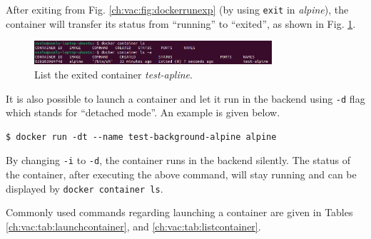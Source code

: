 After exiting from Fig. \ref{ch:vac:fig:dockerrunexp} (by using \verb|exit| in \textit{alpine}), the container will transfer its status from ``running'' to ``exited'', as shown in Fig. \ref{ch:vac:fig:dockerrunexppart3}.
\begin{figure}
	\centering
	\includegraphics[width=250pt]{chapters/ch-virtualization-and-containerization/figures/dockerrunexppart3.png}
	\caption{List the exited container \textit{test-apline}.} \label{ch:vac:fig:dockerrunexppart3}
\end{figure}

It is also possible to launch a container and let it run in the backend using \verb|-d| flag which stands for ``detached mode''. An example is given below.
\begin{lstlisting}
$ docker run -dt --name test-background-alpine alpine
\end{lstlisting}
By changing \verb|-i| to \verb|-d|, the container runs in the backend silently. The status of the container, after executing the above command, will stay running and can be displayed by \verb|docker container ls|.

Commonly used commands regarding launching a container are given in Tables \ref{ch:vac:tab:launchcontainer}, and \ref{ch:vac:tab:listcontainer}.

